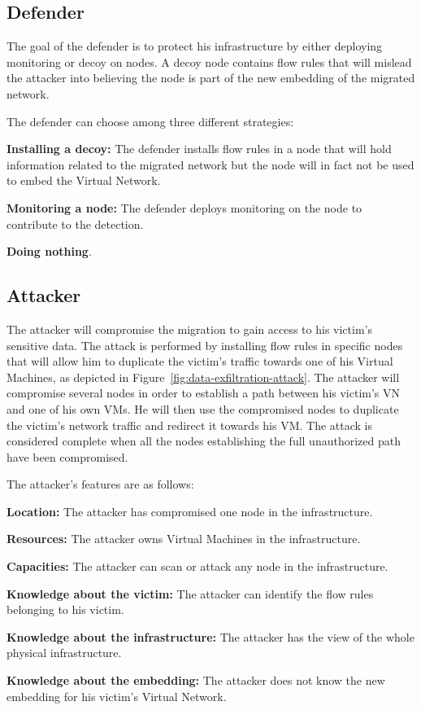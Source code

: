 \subsection{Defender}
The goal of the defender is to protect his infrastructure by either deploying monitoring or decoy on nodes. A decoy node contains flow rules that will mislead the attacker into believing the node is part of the new embedding of the migrated network.

The defender can choose among three different strategies:
\begin{description}
\item \textbf{Installing a decoy: } The defender installs flow rules in a node that will hold information related to the migrated network but the node will in fact not be used to embed the Virtual Network.
\item \textbf{Monitoring a node: } The defender deploys monitoring on the node to contribute to the detection.
\item \textbf{Doing nothing}.
\end{description}

\subsection{Attacker}
The attacker will compromise the migration to gain access to his victim's sensitive data.
The attack is performed by installing flow rules in specific nodes that will allow him to duplicate the victim's traffic towards one of his Virtual Machines, as depicted in Figure~\ref{fig:data-exfiltration-attack}. 
The attacker will compromise several nodes in order to establish a path between his victim's VN and one of his own VMs.
He will then use the compromised nodes to duplicate the victim's network traffic and redirect it towards his VM.
The attack is considered complete when all the nodes establishing the full unauthorized path have been compromised.

The attacker's features are as follows:
\begin{description}
\item \textbf{Location: } The attacker has compromised one node in the infrastructure.
\item \textbf{Resources: } The attacker owns Virtual Machines in the infrastructure.
\item \textbf{Capacities: } The attacker can scan or attack any node in the infrastructure.
\item \textbf{Knowledge about the victim: } The attacker can identify the flow rules belonging to his victim.
\item \textbf{Knowledge about the infrastructure: } The attacker has the view of the whole physical infrastructure.
\item \textbf{Knowledge about the embedding: } The attacker does not know the new embedding for his victim's Virtual Network.
\end{description}

